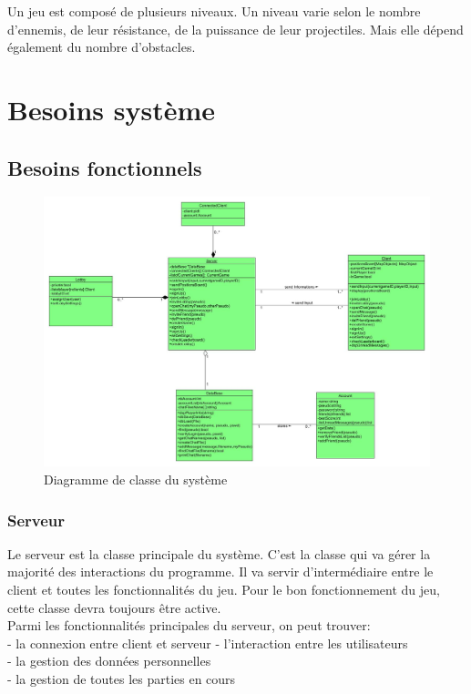\documentclass[a4paper,12pt]{article}
\begin{document}
Un jeu est composé de plusieurs niveaux. Un niveau varie selon le nombre d'ennemis, de leur résistance, de la puissance de leur projectiles. Mais elle dépend également du nombre d'obstacles.

\newpage

\section{Besoins système}
\subsection{Besoins fonctionnels}

\begin{figure}[h!]
\centering
\includegraphics[width=16cm]{newSystemClassDiagram.jpg}
\caption{Diagramme de classe du système}
\label{fig:UerUseCase}
\end{figure}

\subsubsection{Serveur}
Le serveur est la classe principale du système. C'est la classe qui va gérer la majorité des interactions du programme. Il va servir d'intermédiaire entre le client et toutes les fonctionnalités du jeu. Pour le bon fonctionnement du jeu, cette classe devra toujours être active.\\
Parmi les fonctionnalités principales du serveur, on peut trouver:\\
- la connexion entre client et serveur
- l'interaction entre les utilisateurs\\
- la gestion des données personnelles\\
- la gestion de toutes les parties en cours
\end{document}
